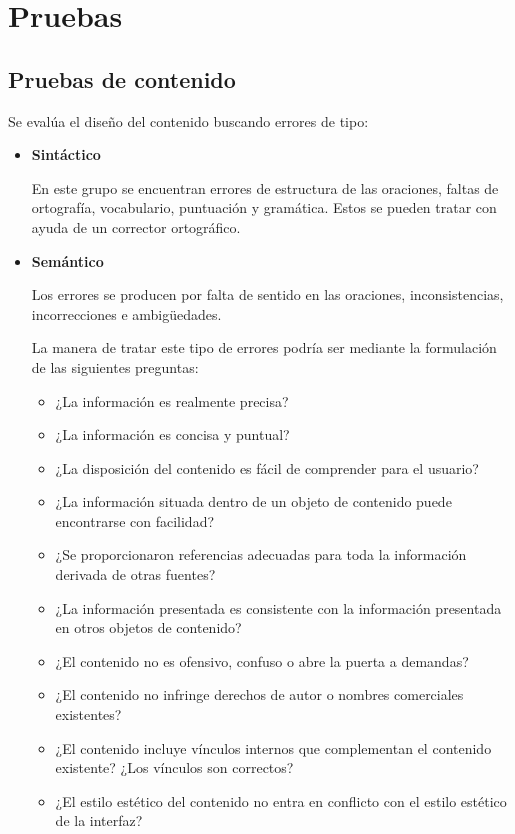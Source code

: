 \chapter{Pruebas}

\section{Pruebas de contenido}

Se evalúa el diseño del contenido buscando errores de tipo:

\begin{itemize}
\item \textbf{Sintáctico}


En este grupo se encuentran errores de estructura de las oraciones, faltas de ortografía, vocabulario, puntuación y gramática. Estos se pueden tratar con ayuda de un corrector ortográfico\cite{ortografo}.


\item \textbf{Semántico}


Los errores se producen por falta de sentido en las oraciones, inconsistencias, incorrecciones e ambigüedades.



La manera de tratar este tipo de errores podría ser mediante la formulación de las siguientes preguntas:
\begin{itemize}
\item ¿La información es realmente precisa?
\item ¿La información es concisa y puntual?
\item ¿La disposición del contenido es fácil de comprender para el usuario?
\item ¿La información situada dentro de un objeto de contenido puede encontrarse con facilidad?
\item ¿Se proporcionaron referencias adecuadas para toda la información derivada de otras fuentes?
\item ¿La información presentada es consistente con la información presentada en otros objetos de contenido?
\item ¿El contenido no es ofensivo, confuso o abre la puerta a demandas?
\item ¿El contenido no infringe derechos de autor o nombres comerciales existentes?
\item ¿El contenido incluye vínculos internos que complementan el contenido existente? ¿Los vínculos son correctos?
\item ¿El estilo estético del contenido no entra en conflicto con el estilo estético de la interfaz?
	

\end{itemize}
\end{itemize}
